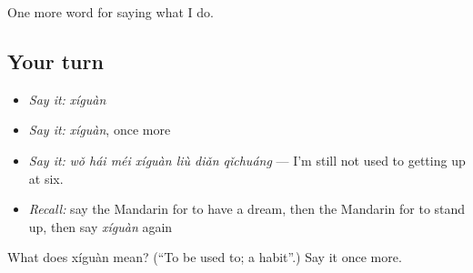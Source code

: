 \begin{grammarlens}[title={What you've built}]
One more word for saying what I do.
\end{grammarlens}

\subsection*{Your turn}
\begin{itemize}
\raggedright
  \item \emph{Say it:} \emph{xíguàn}
  \item \emph{Say it:} \emph{xíguàn}, once more
  \item \emph{Say it:} \emph{wǒ hái méi xíguàn liù diǎn qǐchuáng} — I'm still not used to getting up at six.
  \item \emph{Recall:} say the Mandarin for to have a dream, then the Mandarin for to stand up, then say \emph{xíguàn} again
\end{itemize}

\begin{tcolorbox}[breakable,colback=teal!4,colframe=teal!35!black,title={Before you move on}]
What does xíguàn mean? (\textquotedblleft{}To be used to; a habit\textquotedblright{}.) Say it once more.
\end{tcolorbox}

